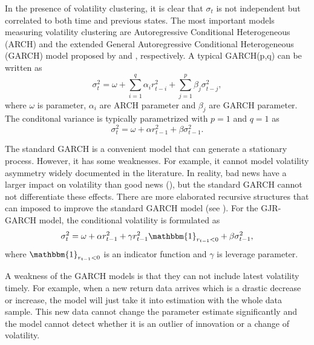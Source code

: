 \documentclass[preprint,12pt,authoryear]{elsarticle}
\begin{document}
In the presence of volatility clustering, it is clear that $\sigma_t$ is not independent but correlated to both time and previous states. The most important models measuring volatility clustering are Autoregressive Conditional Heterogeneous (ARCH) and the extended General Autoregressive Conditional Heterogeneous (GARCH) model proposed by \cite{Engle1982} and \cite{Bollerslev1986}, respectively. A typical GARCH(p,q) can be written as
\begin{equation}
	\sigma_t^2=\omega+\sum_{i=1}^q\alpha_i r_{t-i}^2+ \sum_{j=1}^p\beta_j \sigma_{t-j}^2,
\end{equation}
where $\omega$ is parameter, $\alpha_i$ are ARCH parameter and $\beta_j$ are GARCH parameter.
The conditonal variance is typically parametrized with $p=1$ and $q=1$ as
\begin{equation}
	\sigma_t^2=\omega+\alpha r_{t-1}^2+\beta \sigma_{t-1}^2.
\end{equation}

The standard GARCH is a convenient model that can generate a stationary process. However, it has some weaknesses. For example, it cannot model volatility asymmetry widely documented in the literature. In reality, bad news have a larger impact on volatility than good news (\cite{Conrad2020}), but the standard GARCH cannot not differentiate these effects.
There are more elaborated recursive structures that can imposed to improve the standard GARCH model (see \cite{Glosten1993}). For the GJR-GARCH model, the conditional volatility is formulated as
\begin{equation}
	\sigma_t^2=\omega+\alpha r_{t-1}^2 +\gamma r_{t-1}^2\mathbbm{1}_{r_{t-1}<0} +\beta \sigma_{t-1}^2,
\end{equation}
where $\mathbbm{1}_{r_{t-1}<0}$ is an indicator function and $\gamma$ is leverage parameter.



A weakness of the GARCH models is that they can not include latest volatility timely.
For example, when a new return data arrives which is a drastic decrease or increase, the model will just take it into estimation with the whole data sample. This new data cannot change the parameter estimate significantly and the model cannot detect whether it is an outlier of innovation or a change of volatility.
\end{document}
